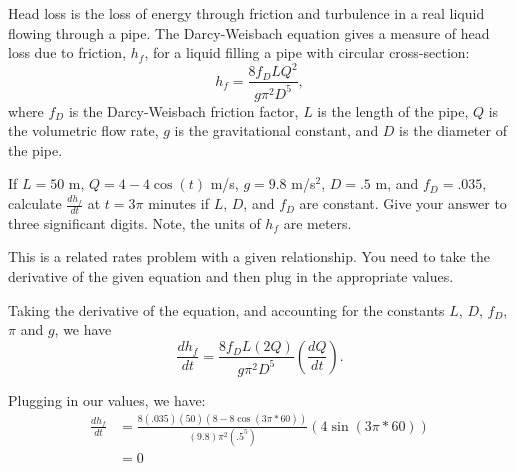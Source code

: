 \documentclass{ximera}
\author{Emma Smith Zbarsky}
\begin{document}
\begin{exercise}

Head loss is the loss of energy through friction and turbulence in a
real liquid flowing through a pipe. The Darcy-Weisbach equation gives a
measure of head loss due to friction, $h_f$, for a liquid filling a pipe
with circular cross-section: \[h_f = \frac{8f_D LQ^2}{g\pi^2D^5}, \]
where $f_D$ is the Darcy-Weisbach friction factor, $L$ is the length of
the pipe, $Q$ is the volumetric flow rate, $g$ is the gravitational
constant, and $D$ is the diameter of the pipe.

If $L=50$ m, $Q = 4-4\cos(t)$ m/s, $g=9.8$ m/s$^2$, $D=.5$ m, and
$f_D = .035$, calculate $\frac{dh_f}{dt}$ at $t=3\pi$ minutes if $L$,
$D$, and $f_D$ are constant. Give your answer to three significant
digits. Note, the units of $h_f$ are meters.


\begin{hint}
This is a related rates problem with a given relationship. You need to
take the derivative of the given equation and then plug in the
appropriate values.
\end{hint}


\begin{hint}
Taking the derivative of the equation, and accounting for the constants
$L$, $D$, $f_D$, $\pi$ and $g$, we have
\[\frac{dh_f}{dt} = \frac{8f_DL(2Q)}{g\pi^2D^5}\left(\frac{dQ}{dt}\right).\]

Plugging in our values, we have: \begin{align*}\frac{dh_f}{dt} &= \frac{8(.035)(50)(8-8\cos(3\pi*60))}{(9.8)\pi^2(.5^5)}\left(4\sin(3\pi*60)\right)\\
&= 0
\end{align*}
\end{hint}


\begin{multipleChoice}
\end{multipleChoice}

\end{exercise}
\end{document}

